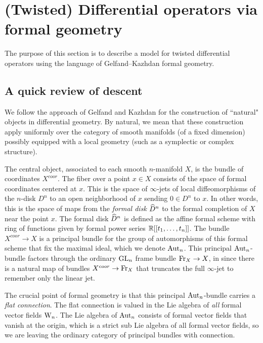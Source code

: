 \section{(Twisted) Differential operators via formal geometry}

The purpose of this section is to describe a model for twisted differential operators using the language of Gelfand--Kazhdan formal geometry. 


\subsection{A quick review of descent}

We follow the approach of Gelfand and Kazhdan \cite{GK} for the construction of ``natural" objects in differential geometry. 
By natural, we mean that these construction apply uniformly over the category of smooth manifolds (of a fixed dimension) possibly equipped with a local geometry (such as a symplectic or complex structure). 

The central object, associated to each smooth $n$-manifold $X$, is the bundle of coordinates $X^{coor}$. 
The fiber over a point $x \in X$ consists of the space of formal coordinates centered at $x$. 
This is the space of $\infty$-jets of local diffeomorphisms of the $n$-disk $D^n$ to an open neighborhood of $x$ sending $0 \in D^n$ to $x$. 
In other words, this is the space of maps from the {\em formal disk} $\widehat{D}^n$ to the formal completion of $X$ near the point $x$. 
The formal disk $\widehat{D}^n$ is defined as the affine formal scheme with ring of functions given by formal power series $\mathbb R[[t_1,\ldots,t_n]]$.
The bundle $X^{coor} \to X$ is a principal bundle for the group of automorphisms of this formal scheme that fix the maximal ideal, which we denote ${\rm Aut}_n$. 
This principal ${\rm Aut}_n$-bundle factors through the ordinary ${\rm GL}_n$ frame bundle ${\rm Fr}_X \to X$, in since there is a natural map of bundles $X^{coor} \to {\rm Fr}_X$ that truncates the full $\infty$-jet to remember only the linear jet. 

The crucial point of formal geometry is that this principal ${\rm Aut}_n$-bundle carries a {\em flat connection}. 
The flat connection is valued in the Lie algebra of {\em all} formal vector fields ${{\rm W}_n}$.	
The Lie algebra of ${\rm Aut}_n$ consists of formal vector fields that vanish at the origin, which is a strict sub Lie algebra of all formal vector fields, so we are leaving the ordinary category of principal bundles with connection. 


